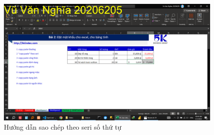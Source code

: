 \documentclass{article}
\begin{document}
\begin{figure}[H]
\centering
\includegraphics[scale = 0.15]{Video4/HuongDan/2.png}
\caption{Hướng dẫn sao chép theo seri số thứ tự}
\end{figure}



\end{document}
